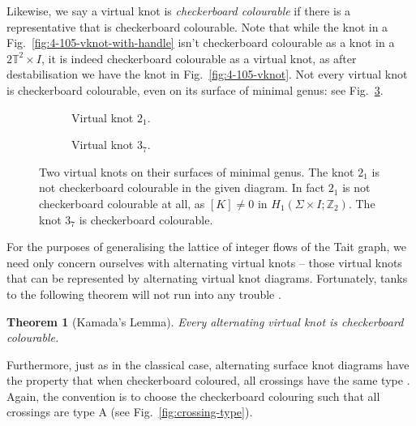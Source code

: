 \documentclass[12pt]{report}
\newcommand{\Z}{\mathbb{Z}}
\newcommand{\T}{\mathbb{T}}
\newtheorem*{theorem}{Theorem}
\theoremstyle{upright}
\begin{document}
Likewise, we say a virtual knot is \textit{checkerboard colourable} if there is a representative that is checkerboard colourable. Note that while the knot in a Fig.~\ref{fig:4-105-vknot-with-handle} isn't checkerboard colourable as a knot in a $2\T^{2} \times I$, it is indeed checkerboard colourable as a virtual knot, as after destabilisation we have the knot in Fig.~\ref{fig:4-105-vknot}. Not every virtual knot is checkerboard colourable, even on its surface of minimal genus: see Fig.~\ref{fig:cc-of-vknots}.

\begin{figure}[hbt!]
	\hspace*{\fill}
	\begin{subfigure}[b]{0.45 \textwidth}
		\centering
		\def\svgscale{0.35}
		
		\caption{Virtual knot $2_{1}$.}
		\label{fig:non-cc-vknot}
	\end{subfigure}
	\hspace*{\fill}
	\begin{subfigure}[b]{0.45 \textwidth}
		\centering
		\def\svgscale{0.35}
		
		\caption{Virtual knot $3_{7}$.}
		\label{fig:cc-vknot}
	\end{subfigure}
	\hspace*{\fill}
	\caption{Two virtual knots on their surfaces of minimal genus. The knot $2_{1}$ is not checkerboard colourable in the given diagram. In fact $2_{1}$ is not checkerboard colourable at all, as $[K] \neq 0$ in $H_{1}(\Sigma \times I; \Z_{2})$. The knot $3_{7}$ is checkerboard colourable.}
	\label{fig:cc-of-vknots}
\end{figure}

For the purposes of generalising the lattice of integer flows of the Tait graph, we need only concern ourselves with alternating virtual knots -- those virtual knots that can be represented by alternating virtual knot diagrams. Fortunately, tanks to the following theorem will not run into any trouble \cite[Lemma 7]{jones-polynomial-checkerboard-colourable}.

\begin{theorem}[Kamada's Lemma]
	Every alternating virtual knot is checkerboard colourable.
\end{theorem}

Furthermore, just as in the classical case, alternating surface knot diagrams have the property that when checkerboard coloured, all crossings have the same type \cite[Lemma 6]{alternating-links-thickened-surfaces}. Again, the convention is to choose the checkerboard colouring such that all crossings are type A (see Fig.~\ref{fig:crossing-type}).
\end{document}
